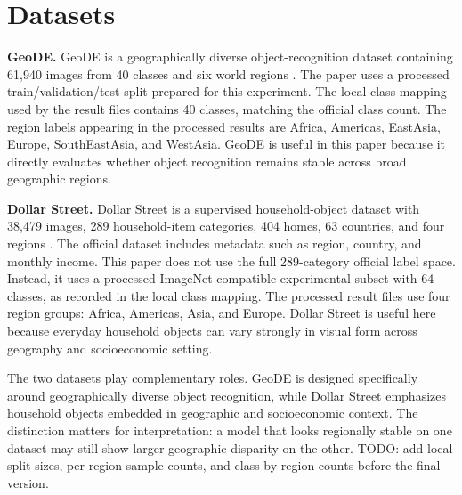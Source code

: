 \section{Datasets}

\noindent\textbf{GeoDE.}
GeoDE is a geographically diverse object-recognition dataset containing 61,940 images from 40 classes and six world regions \citep{ramaswamy2023geode}. The paper uses a processed train/validation/test split prepared for this experiment. The local class mapping used by the result files contains 40 classes, matching the official class count. The region labels appearing in the processed results are Africa, Americas, EastAsia, Europe, SouthEastAsia, and WestAsia. GeoDE is useful in this paper because it directly evaluates whether object recognition remains stable across broad geographic regions.

\noindent\textbf{Dollar Street.}
Dollar Street is a supervised household-object dataset with 38,479 images, 289 household-item categories, 404 homes, 63 countries, and four regions \citep{rojas2022dollarstreet}. The official dataset includes metadata such as region, country, and monthly income. This paper does not use the full 289-category official label space. Instead, it uses a processed ImageNet-compatible experimental subset with 64 classes, as recorded in the local class mapping. The processed result files use four region groups: Africa, Americas, Asia, and Europe. Dollar Street is useful here because everyday household objects can vary strongly in visual form across geography and socioeconomic setting.



The two datasets play complementary roles. GeoDE is designed specifically around geographically diverse object recognition, while Dollar Street emphasizes household objects embedded in geographic and socioeconomic context. The distinction matters for interpretation: a model that looks regionally stable on one dataset may still show larger geographic disparity on the other. TODO: add local split sizes, per-region sample counts, and class-by-region counts before the final version.
